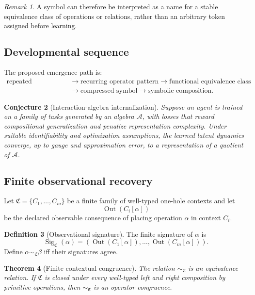 \documentclass[11pt]{article}
\newtheorem{theorem}{Theorem}[section]
\newtheorem{conjecture}[theorem]{Conjecture}
\theoremstyle{definition}
\newtheorem{definition}[theorem]{Definition}
\theoremstyle{remark}
\newtheorem{remark}[theorem]{Remark}
\newcommand{\Sig}{\operatorname{Sig}}
\begin{document}
\begin{remark}
A symbol can therefore be interpreted as a name for a stable equivalence class of operations or relations, rather than an arbitrary token assigned before learning.
\end{remark}

\subsection{Developmental sequence}

The proposed emergence path is:
\[
\begin{aligned}
\text{repeated interaction}
&\to
\text{recurring operator pattern}
\to
\text{functional equivalence class}\\
&\to
\text{compressed symbol}
\to
\text{symbolic composition}.
\end{aligned}
\]

\begin{conjecture}[Interaction-algebra internalization]
Suppose an agent is trained on a family of tasks generated by an algebra \(\mathcal A\), with losses that reward compositional generalization and penalize representation complexity. Under suitable identifiability and optimization assumptions, the learned latent dynamics converge, up to gauge and approximation error, to a representation of a quotient of \(\mathcal A\).
\end{conjecture}

\subsection{Finite observational recovery}

Let \(\mathfrak C=\{C_1,\ldots,C_m\}\) be a finite family of well-typed one-hole contexts and let
\[
\operatorname{Out}(C_i[\alpha])
\]
be the declared observable consequence of placing operation \(\alpha\) in context \(C_i\).

\begin{definition}[Observational signature]
The finite signature of \(\alpha\) is
\[
\Sig_{\mathfrak C}(\alpha)
=
\left(
\operatorname{Out}(C_1[\alpha]),\ldots,
\operatorname{Out}(C_m[\alpha])
\right).
\]
Define \(\alpha\sim_{\mathfrak C}\beta\) iff their signatures agree.
\end{definition}

\begin{theorem}[Finite contextual congruence]
The relation \(\sim_{\mathfrak C}\) is an equivalence relation. If \(\mathfrak C\) is closed under every well-typed left and right composition by primitive operations, then \(\sim_{\mathfrak C}\) is an operator congruence.
\end{theorem}
\end{document}
